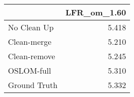 \begin{tabular}{lr}
\toprule
{} & LFR_om_1.60 \\
\midrule
No Clean Up  &       5.418 \\
Clean-merge  &       5.210 \\
Clean-remove &       5.245 \\
OSLOM-full   &       5.310 \\
Ground Truth &       5.332 \\
\bottomrule
\end{tabular}
